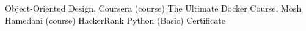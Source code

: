 %
%
%


\begin{scholarship}
					{Object-Oriented Design, Coursera (course)}
					{The Ultimate Docker Course, Mosh Hamedani (course)}
					{HackerRank Python (Basic) Certificate}
\end{scholarship}